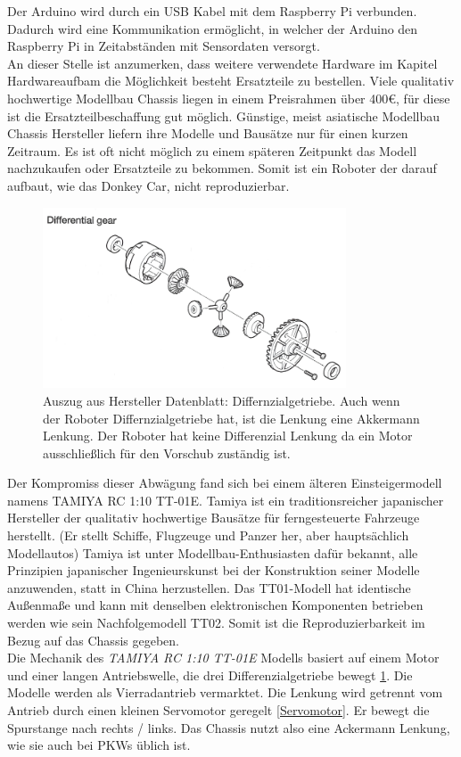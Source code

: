 \documentclass[conference]{IEEEtran}
\begin{document}
	Der Arduino wird durch ein USB Kabel mit dem Raspberry Pi verbunden.
	Dadurch wird eine Kommunikation ermöglicht, in welcher der Arduino 
	den Raspberry Pi in Zeitabständen mit Sensordaten versorgt.
	\\
	An dieser Stelle ist anzumerken, dass weitere verwendete Hardware im 
	Kapitel Hardwareaufbam die Möglichkeit besteht Ersatzteile zu bestellen. 
	Viele qualitativ hochwertige Modellbau Chassis liegen in einem 
	Preisrahmen über 400€, für diese ist die Ersatzteilbeschaffung gut 
	möglich. Günstige, meist asiatische Modellbau Chassis Hersteller liefern 
	ihre Modelle und Bausätze nur für einen kurzen Zeitraum. Es ist oft nicht 
	möglich zu einem späteren Zeitpunkt das Modell nachzukaufen oder 
	Ersatzteile zu bekommen. Somit ist ein Roboter der darauf aufbaut, wie 
	das Donkey Car, nicht reproduzierbar. 
	\\
	\begin{figure} %
		\centering
		\includegraphics[width=9cm]{img/geer.png}
		\caption{Auszug aus Hersteller Datenblatt: Differnzialgetriebe. Auch 
		wenn der Roboter Differnzialgetriebe hat, ist die Lenkung eine 
		Akkermann Lenkung. Der Roboter hat keine Differenzial Lenkung da 
		ein Motor ausschließlich für den Vorschub zuständig ist. }
		\label{Getriebe}
	\end{figure}
	Der Kompromiss dieser Abwägung fand sich bei einem älteren 
	Einsteigermodell namens TAMIYA RC 1:10 TT-01E. Tamiya \cite{Tamiya} ist ein 
	traditionsreicher japanischer Hersteller der qualitativ hochwertige 
	Bausätze für ferngesteuerte Fahrzeuge herstellt. (Er stellt Schiffe, Flugzeuge 
	und Panzer her, aber hauptsächlich Modellautos) Tamiya \cite{Tamiya} ist unter 
	Modellbau-Enthusiasten dafür bekannt, alle Prinzipien japanischer 
	Ingenieurskunst bei der Konstruktion seiner Modelle anzuwenden, statt 
	 in China herzustellen. Das TT01-Modell hat 
	identische Außenmaße und kann mit denselben elektronischen Komponenten 
	betrieben werden wie sein Nachfolgemodell TT02. Somit ist die 
	Reproduzierbarkeit im Bezug auf das Chassis gegeben.
	\\
	Die Mechanik des \textit{TAMIYA RC 1:10 TT-01E } Modells basiert auf 
	einem Motor und einer langen Antriebswelle, die drei Differenzialgetriebe 
	bewegt \ref{Getriebe}. Die Modelle werden als Vierradantrieb vermarktet. 
	Die Lenkung wird getrennt vom Antrieb durch einen kleinen Servomotor 
	geregelt \ref{Servomotor}. Er bewegt die Spurstange nach rechts / links. Das 
	Chassis nutzt also eine Ackermann Lenkung, wie sie auch bei PKWs üblich ist.
	
\end{document}
